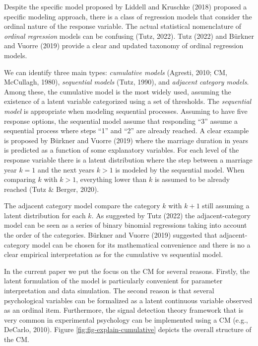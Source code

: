 \documentclass[
  man,floatsintext]{apa6}
\begin{document}
Despite the specific model proposed by Liddell and Kruschke (2018) proposed a specific modeling approach, there is a class of regression models that consider the ordinal nature of the response variable. The actual statistical nomenclature of \emph{ordinal regression} models can be confusing (Tutz, 2022). Tutz (2022) and Bürkner and Vuorre (2019) provide a clear and updated taxonomy of ordinal regression models.

We can identify three main types: \emph{cumulative models} (Agresti, 2010; CM, McCullagh, 1980), \emph{sequential models} (Tutz, 1990), and \emph{adjacent category models}. Among these, the cumulative model is the most widely used, assuming the existence of a latent variable categorized using a set of thresholds. The \emph{sequential model} is appropriate when modeling sequential processes. Assuming to have five response options, the sequential model assume that responding ``3'' assume a sequential process where steps ``1'' and ``2'' are already reached. A clear example is proposed by Bürkner and Vuorre (2019) where the marriage duration in years is predicted as a function of some explanatory variables. For each level of the response variable there is a latent distribution where the step between a marriage year \(k = 1\) and the next years \(k > 1\) is modeled by the sequential model. When comparing \(k\) with \(k > 1\), everything lower than \(k\) is assumed to be already reached (Tutz \& Berger, 2020).

The adjacent category model compare the category \(k\) with \(k + 1\) still assuming a latent distribution for each \(k\). As suggested by Tutz (2022) the adjacent-category model can be seen as a series of binary binomial regressions taking into account the order of the categories. Bürkner and Vuorre (2019) suggested that adjacent-category model can be chosen for its mathematical convenience and there is no a clear empirical interpretation as for the cumulative vs sequential model.

In the current paper we put the focus on the CM for several reasons. Firstly, the latent formulation of the model is particularly convenient for parameter interpretation and data simulation. The second reason is that several psychological variables can be formalized as a latent continuous variable observed as an ordinal item. Furthermore, the signal detection theory framework that is very common in experimental psychology can be implemented using a CM (e.g., DeCarlo, 2010). Figure \ref{fig:fig-explain-cumulative} depicts the overall structure of the CM.
\end{document}
